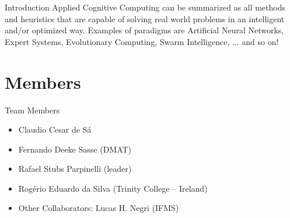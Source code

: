 \documentclass{beamer}
\begin{document}
\begin{frame}{Introduction}
Applied Cognitive Computing can be summarized as all methods and heuristics that are capable of solving real world problems in an intelligent and/or optimized way.  Examples of paradigms are Artificial Neural Networks, Expert Systems, Evolutionary Computing, Swarm Intelligence, ... and so on!
\end{frame}


\section{Members}
\begin{frame}{Team Members}

\begin{itemize}
  \item Claudio Cesar de Sá
  \item Fernando Deeke Sasse (DMAT)
  \item Rafael Stubs Parpinelli (leader)
  \item Rogério Eduardo da Silva (Trinity College -- Ireland)
  \item Other Collaborators: Lucas H. Negri (IFMS)
\end{itemize}
\end{frame}
\end{document}
